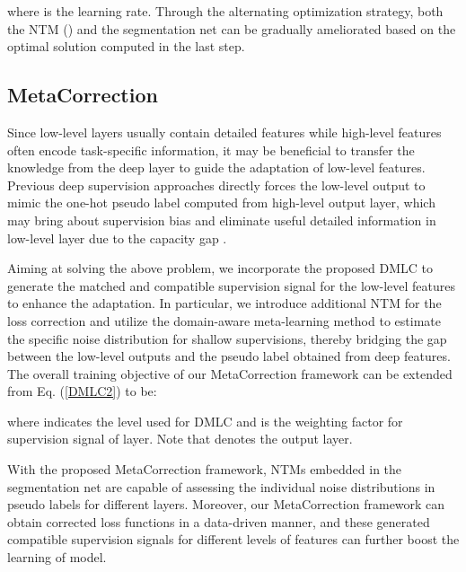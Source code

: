 \documentclass[final]{cvpr}
\begin{document}
where  is the learning rate. Through the alternating optimization strategy, both the NTM () and the segmentation net  can be gradually ameliorated based on the optimal solution computed in the last step. 

\subsection{MetaCorrection}
Since low-level layers usually contain detailed features while high-level features often encode task-specific information, it may be beneficial to transfer the knowledge from the deep layer to guide the adaptation of low-level features. Previous deep supervision approaches \cite{chen2019domain, tsai2018learning} directly forces the low-level output to mimic the one-hot pseudo label computed from high-level output layer, which may bring about supervision bias and eliminate useful detailed information in low-level layer due to the capacity gap \cite{cho2019efficacy, liu2020metadistiller}. 

Aiming at solving the above problem, we incorporate the proposed DMLC to generate the matched and compatible supervision signal for the low-level features to enhance the adaptation. In particular, we introduce additional NTM for the loss correction and utilize the domain-aware meta-learning method to estimate the specific noise distribution for shallow supervisions, thereby bridging the gap between the low-level outputs and the pseudo label obtained from deep features. The overall training objective of our MetaCorrection framework can be extended from Eq. (\ref{DMLC2}) to be:

where  indicates the level used for DMLC and  is the weighting factor for supervision signal of  layer. Note that  denotes the output layer. 

With the proposed MetaCorrection framework, NTMs embedded in the segmentation net are capable of assessing the individual noise distributions in pseudo labels for different layers. Moreover, our MetaCorrection framework can obtain corrected loss functions in a data-driven manner, and these generated compatible supervision signals for different levels of features can further boost the learning of model.
\end{document}
